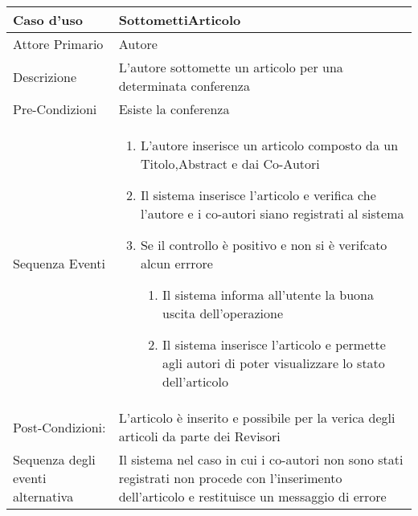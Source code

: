 \begin{tabular}{|p{3cm}|p{7cm}|}
\hline 
\rowcolor{Orchid}
Caso d'uso & SottomettiArticolo \\
\hline
Attore Primario & Autore\\
\hline
Descrizione & L'autore sottomette un articolo per una determinata conferenza\\
\hline
Pre-Condizioni& Esiste la conferenza\\
\hline
  Sequenza Eventi &
                    \begin{enumerate}
                    \item L'autore inserisce un articolo composto da un Titolo,Abstract e dai Co-Autori
                    \item Il sistema inserisce l'articolo e verifica che l'autore e i co-autori siano registrati al sistema
                    \item Se il controllo è positivo e non si è verifcato alcun errrore
                      \begin{enumerate}
                      \item Il sistema informa all'utente la buona uscita dell'operazione
                      \item Il sistema inserisce l'articolo e permette agli autori di poter visualizzare lo stato dell'articolo
                      \end{enumerate}
                    \end{enumerate} \\
\hline
Post-Condizioni: &L'articolo è inserito e possibile per la verica degli articoli da parte dei Revisori\\
\hline
Sequenza degli eventi alternativa & Il sistema nel caso in cui i co-autori non sono stati registrati non procede con l'inserimento dell'articolo e restituisce un messaggio di errore\\
\hline
\end{tabular}

